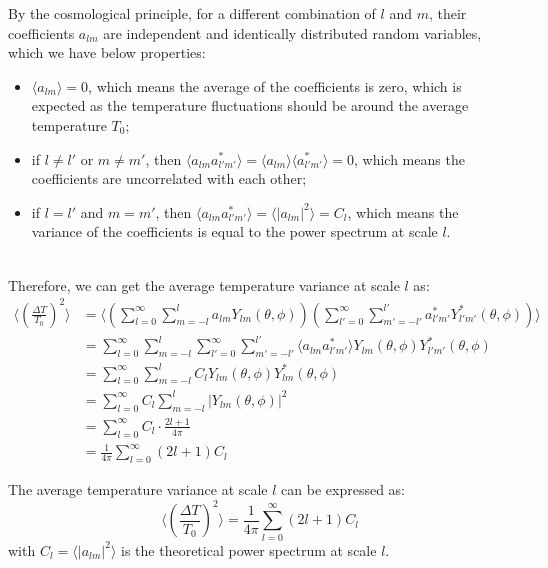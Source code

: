 \bigskip \noindent
\begin{foundation}
    By the cosmological principle, for a different combination of $l$ and $m$, their coefficients $a_{lm}$ are independent and identically distributed random variables, which we have below properties:
    \begin{itemize}
        \item $\langle a_{lm} \rangle = 0$, which means the average of the coefficients is zero, which is expected as the temperature fluctuations should be around the average temperature $T_0$;
        \item if $l \neq l'$ or $m \neq m'$, then $\langle a_{lm} a_{l'm'}^* \rangle = \langle a_{lm} \rangle \langle a_{l'm'}^* \rangle = 0$, which means the coefficients are uncorrelated with each other;
        \item if $l = l'$ and $m = m'$, then $\langle a_{lm} a_{l'm'}^* \rangle = \langle |a_{lm}|^2 \rangle = C_l$, which means the variance of the coefficients is equal to the power spectrum at scale $l$.
    \end{itemize} \\

    Therefore, we can get the average temperature variance at scale $l$ as:
    \begin{align*}
        \langle \left( \frac{\Delta T}{T_0} \right)^2 \rangle &= \langle \left( \sum_{l=0}^{\infty} \sum_{m=-l}^{l} a_{lm} Y_{lm}(\theta, \phi) \right) \left( \sum_{l'=0}^{\infty} \sum_{m'=-l'}^{l'} a_{l'm'}^* Y_{l'm'}^*(\theta, \phi) \right) \rangle \\
        &= \sum_{l=0}^{\infty} \sum_{m=-l}^{l} \sum_{l'=0}^{\infty} \sum_{m'=-l'}^{l'} \langle a_{lm} a_{l'm'}^* \rangle Y_{lm}(\theta, \phi) Y_{l'm'}^*(\theta, \phi) \\
        &= \sum_{l=0}^{\infty} \sum_{m=-l}^{l} C_l Y_{lm}(\theta, \phi) Y_{lm}^*(\theta, \phi) \\
        &= \sum_{l=0}^{\infty} C_l \sum_{m=-l}^{l} |Y_{lm}(\theta, \phi)|^2 \\
        &= \sum_{l=0}^{\infty} C_l \cdot \frac{2l + 1}{4\pi} \\
         &= \frac{1}{4\pi} \sum_{l=0}^{\infty} (2l + 1) C_l
    \end{align*}
\end{foundation}

\bigskip \noindent
\begin{theory}
    The average temperature variance at scale $l$ can be expressed as:
    \[
        \langle \left( \frac{\Delta T}{T_0} \right)^2 \rangle = \frac{1}{4\pi} \sum_{l=0}^{\infty} (2l + 1) C_l
    \]
    with $C_l = \langle |a_{lm}|^2 \rangle$ is the theoretical power spectrum at scale $l$.
\end{theory}


